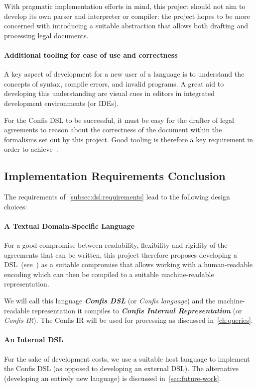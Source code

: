 With pragmatic implementation efforts in mind, this project should not aim to develop its own parser and interpreter or compiler: the project hopes to be more concerned with introducing a suitable abstraction that allows both drafting and processing legal documents.

\paragraph{Additional tooling for ease of use and correctness}

A key aspect of development for a new user of a language is to understand the concepts of syntax, compile errors, and invalid programs.
A great aid to developing this understanding are visual cues in editors in integrated development environments (or IDEs).

For the Confis DSL to be successful, it must be easy for the drafter of legal agreements to reason about the correctness of the document within the formalisms set out by this project.
Good tooling is therefore a key requirement in order to achieve~.

\subsection{Implementation Requirements Conclusion}\label{subsec:dsl-design-conclusion}

The requirements of~\autoref{subsec:dsl:requirements} lead to the following design choices:

\paragraph{A Textual Domain-Specific Language} For a good compromise between readability, flexibility and rigidity of the agreements that can be written, this project therefore proposes developing a DSL~(see~) as a suitable compromise that allows working with a human-readable encoding which can then be compiled to a suitable machine-readable representation.

We will call this language \textbf{\emph{Confis DSL}} (or \emph{Confis language}) and the machine-readable representation it compiles to \textbf{\emph{Confis Internal Representation}} (or \emph{Confis IR}).
The Confis IR will be used for processing as discussed in~\autoref{ch:queries}.

\paragraph{An Internal DSL}
For the sake of development costs, we use a suitable host language to implement the Confis DSL (as opposed to developing an external DSL).
The alternative (developing an entirely new language) is discussed in~\autoref{sec:future-work}.

